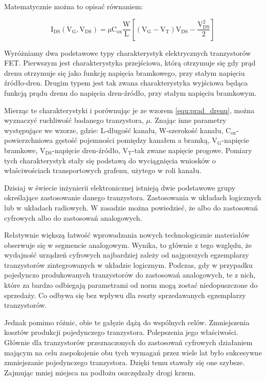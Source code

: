 Matematycznie można to opisać równaniem:

\begin{equation}
    \mathrm{ I_{DS}(V_G, V_{DS}) = \mu C_{ox} \frac{W}{L}[(V_G - V_T)V_{DS} - \frac{V_{DS}^2}{2}]}
	\label{equ:prad_drenu}
\end{equation}

Wyróżniamy dwa podstawowe typy charakterystyk elektrycznych tranzystorów FET. Pierwszym jest charakterystyka przejściowa,
którą otrzymuje się gdy prąd drenu otrzymuje się jako funkcję napięcia bramkowego, przy stałym napięciu źródło-dren. 
Drugim typem jest tak zwana charakterystyka wyjściowa będąca funkcją prądu drenu do napięcia dren-źródło, przy stałym 
napięciu bramkowym.

Mierząc te charakterystyki i porównując je ze wzorem \ref{equ:prad_drenu}, można wyznaczyć ruchliwość badanego tranzystora, $\mu$. 
Znając inne parametry występujące we wzorze, gdzie: L-długość kanału, W-szerokość kanału, 
$\mathrm {C_{ox}}$-powierzchniowa gęstość
 pojemności pomiędzy kanałem a bramką, $\mathrm{ V_G}$-napięcie bramkowe,
 $\mathrm{ V_{DS}}$-napięcie dren-źródło, $\mathrm{ V_T}$-tak zwane napięcie progowe.
Pomiary tych charakterystyk stały się podstawą do wyciągnięcia wniosków o właściwościach transportowych grafenu, użytego
w roli kanału.

Dzisiaj w świecie inżynierii elektronicznej istnieją dwie podstawowe grupy określające zastosowanie danego tranzystora. 
Zastosowania w układach logicznych lub w układach radiowych. W zasadzie można powiedzieć, że albo do zastosowań cyfrowych
albo do zastosowań analogowych. 

Relatywnie większą łatwość wprowadzania nowych technologicznie materiałów obserwuje się w segmencie analogowym. Wynika, to
głównie z tego względu, że wydajność urządzeń cyfrowych najbardziej zależy od najgorszych egzemplarzy tranzystorów 
zintegrowanych w układzie logicznym. Podczas, gdy w przypadku pojedynczo produkowanych tranzystorów do zastosowań analogowych,
te z nich, które za bardzo odbiegają parametrami od norm mogą zostać niedopuszczone do sprzedaży. Co odbywa się bez wpływu
dla reszty sprzedawanych egzemplarzy tranzystorów.

Jednak pomimo różnic, obie te gałęzie dążą do wspólnych celów. Zmniejszenia kosztów produkcji pojedynczego tranzystora.
Polepszenia jego właściwości. Głównie dla tranzystorów przeznaczonych do zastosowań cyfrowych działaniem mającym na celu
 zaspokojenie obu tych wymagań przez wiele lat było sukcesywne zmniejszanie pojedynczego tranzystora. Dzięki temu stawały
 się one szybsze. Zajmując mniej miejsca na podłożu oszczędzały drogi krzem.

